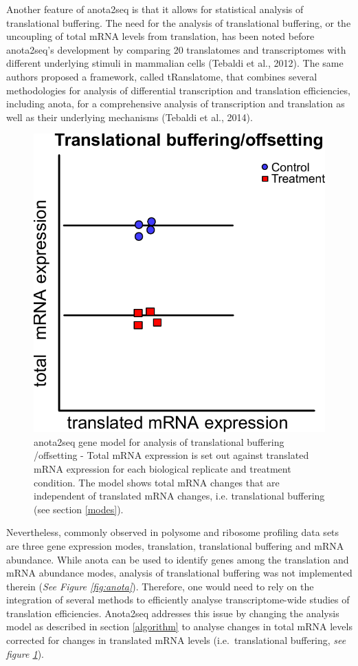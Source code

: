 \documentclass[
  12pt,
  openany]{book}
\begin{document}
Another feature of anota2seq is that it allows for statistical analysis of translational buffering. The need for the analysis of translational buffering, or the uncoupling of total mRNA levels from translation, has been noted before anota2seq's development by comparing 20 translatomes and transcriptomes with different underlying stimuli in mammalian cells (Tebaldi et al., 2012). The same authors proposed a framework, called tRanslatome, that combines several methodologies for analysis of differential transcription and translation efficiencies, including anota, for a comprehensive analysis of transcription and translation as well as their underlying mechanisms (Tebaldi et al., 2014).

\begin{figure}
  \includegraphics{./figures/geneModes_anota2seq.pdf}
  \caption{anota2seq gene model for analysis of translational buffering /offsetting - Total mRNA expression is set out against translated mRNA expression for each biological replicate and treatment condition. The model shows total mRNA changes that are independent of translated mRNA changes, i.e. translational buffering (see section \ref{modes}).
  \label{fig:anota2seq}}
\end{figure}

Nevertheless, commonly observed in polysome and ribosome profiling data sets are three gene expression modes, translation, translational buffering and mRNA abundance. While anota can be used to identify genes among the translation and mRNA abundance modes, analysis of translational buffering was not implemented therein (\emph{See Figure \ref{fig:anota}}). Therefore, one would need to rely on the integration of several methods to efficiently analyse transcriptome-wide studies of translation efficiencies. Anota2seq addresses this issue by changing the analysis model as described in section \ref{algorithm} to analyse changes in total mRNA levels corrected for changes in translated mRNA levels (i.e.~translational buffering, \emph{see figure \ref{fig:anota2seq}}).
\end{document}
